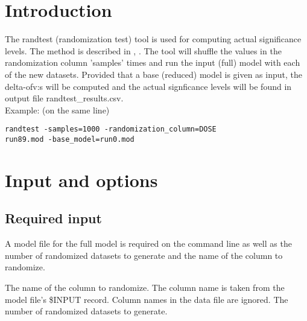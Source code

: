 



\maketitle
\newcommand{\guidetoolname}{randtest}


\section{Introduction}

The randtest (randomization test) tool is used for computing actual significance levels. The method is described in \cite{Wahlby}, \cite{Deng}. 
The tool will shuffle the values in the randomization column ’samples’ times and run the input (full) model with each of the new datasets. Provided that a base (reduced) model is given as input, the delta-ofv:s will be computed and the actual signficance levels will be found in output file randtest\_results.csv.\\
Example: (on the same line)
\begin{verbatim}
randtest -samples=1000 -randomization_column=DOSE 
run89.mod -base_model=run0.mod
\end{verbatim}

\section{Input and options}
\subsection{Required input}
A model file for the full model is required on the command line as well as the number of randomized datasets to generate and the name of the column to randomize.
\begin{optionlist}
	The name of the column to randomize. The column name is taken from the model file's \$INPUT record. Column names in the data file are ignored. 
\nextopt
{}
The number of randomized datasets to generate. 
\nextopt
\end{optionlist}

